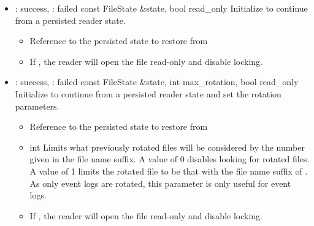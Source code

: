 \begin{itemize}
\item {}
  {} {: success, : failed}
  {const FileState \&state, bool read\_only}
  {Initialize to continue from a persisted reader state.}
  \begin{itemize}
  \item {}
    Reference to the persisted state to restore from
  \item {}
    If , the reader will open the file read-only and
    disable locking.
  \end{itemize}

\item {}
  {} {: success, : failed}
  {const FileState \&state, int max\_rotation, bool read\_only}
  {Initialize to continue from a persisted reader state and set the
  rotation parameters.}
  \begin{itemize}
  \item {}
    Reference to the persisted state to restore from
  \item {} {int}
    Limits what previously rotated files will be considered by the number
    given in the file name suffix.
    A value of 0 disables looking for rotated files.
    A value of 1 limits the rotated file to be that with the file name suffix
    of .
    As only event logs are rotated, this parameter is only useful for
    event logs.
  \item {}
    If , the reader will open the file read-only and
    disable locking.
  \end{itemize}

\end{itemize}

